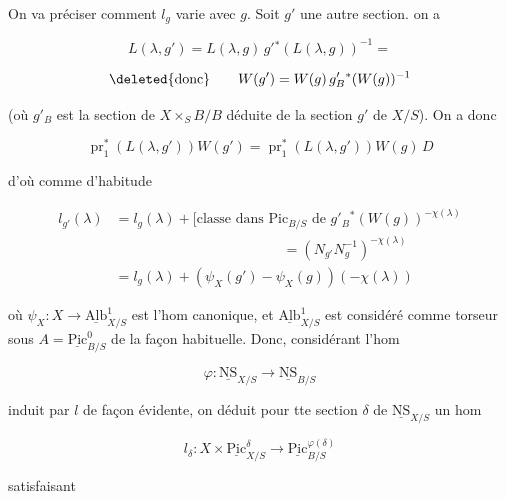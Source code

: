 
On va préciser comment $l_g$ varie avec $g$. Soit $g'$ une autre section.  on a

\[
L(\lambda,g')=L(\lambda,g)\,g'{}^{*}(L(\lambda,g))^{-1}=
\]

\[
\text{\deleted{donc}}\qquad W(g')=W(g)\,g'_B{}^*(W(g))^{-1}
\]

(où $g'_B$ est la section de $X\times_S B/B$ déduite de la section $g'$ de $X/S$). On a donc

\[
\operatorname{pr}_1^{*}(L(\lambda,g'))W(g')=\operatorname{pr}_1^{*}(L(\lambda,g'))W(g)\,D
\]


d'où comme d'habitude

\[
\begin{aligned}l_{g'}(\lambda)&=l_g(\lambda)+\bigl[\text{classe dans }\mathrm{Pic}_{B/S}\text{ de }g'_B{}^{*}(W(g))^{-\chi(\lambda)}\\ &\hspace{12em}=(N_{g'}N_g^{-1})^{-\chi(\lambda)}\\ &=l_g(\lambda)+(\psi_X(g')-\psi_X(g))(-\chi(\lambda))\end{aligned}\tag*{(*)}
\]

où $\psi_X\colon X\longrightarrow\underline{\mathrm{Alb}}^1_{X/S}$ est l'hom canonique, et $\underline{\mathrm{Alb}}^1_{X/S}$ est considéré comme torseur sous $A=\underline{\mathrm{Pic}}^0_{B/S}$ de la façon habituelle. Donc, considérant l'hom

\[
\varphi\colon\underline{\mathrm{NS}}_{X/S}\longrightarrow\underline{\mathrm{NS}}_{B/S}
\]

induit par $l$ de façon évidente, on déduit pour tte section $\delta$ de $\underline{\mathrm{NS}}_{X/S}$ un hom

\[
\boxed{l_\delta\colon X\times\underline{\mathrm{Pic}}^\delta_{X/S}\longrightarrow\underline{\mathrm{Pic}}^{\varphi(\delta)}_{B/S}}
\]

  satisfaisant 
